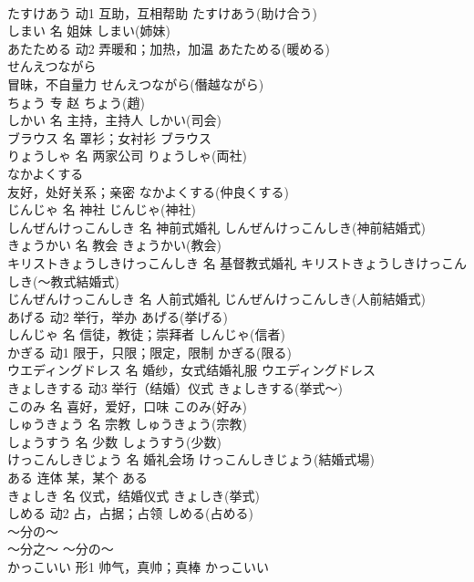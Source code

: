 \documentclass[8pt]{extreport}
\begin{document}
\begin{CJK}{UTF8}{min}
\\	たすけあう	动1	互助，互相帮助	たすけあう(助け合う)	
\\	しまい	名	姐妹	しまい(姉妹)	
\\	あたためる	动2	弄暖和；加热，加温	あたためる(暖める)	
\\	せんえつながら	
\\	冒昧，不自量力	せんえつながら(僭越ながら)	
\\	ちょう	专	赵	ちょう(趙)	
\\	しかい	名	主持，主持人	しかい(司会)	
\\	ブラウス	名	罩衫；女衬衫	ブラウス	
\\	りょうしゃ	名	两家公司	りょうしゃ(両社)	
\\	なかよくする	
\\	友好，处好关系；亲密	なかよくする(仲良くする)	
\\	じんじゃ	名	神社	じんじゃ(神社)	
\\	しんぜんけっこんしき	名	神前式婚礼	しんぜんけっこんしき(神前結婚式)	
\\	きょうかい	名	教会	きょうかい(教会)	
\\	キリストきょうしきけっこんしき	名	基督教式婚礼	キリストきょうしきけっこんしき(～教式結婚式)	
\\	じんぜんけっこんしき	名	人前式婚礼	じんぜんけっこんしき(人前結婚式)	
\\	あげる	动2	举行，举办	あげる(挙げる)	
\\	しんじゃ	名	信徒，教徒；崇拜者	しんじゃ(信者)	
\\	かぎる	动1	限于，只限；限定，限制	かぎる(限る)	
\\	ウエディングドレス	名	婚纱，女式结婚礼服	ウエディングドレス	
\\	きょしきする	动3	举行（结婚）仪式	きょしきする(挙式～)	
\\	このみ	名	喜好，爱好，口味	このみ(好み)	
\\	しゅうきょう	名	宗教	しゅうきょう(宗教)	
\\	しょうすう	名	少数	しょうすう(少数)	
\\	けっこんしきじょう	名	婚礼会场	けっこんしきじょう(結婚式場)	
\\	ある	连体	某，某个	ある	
\\	きょしき	名	仪式，结婚仪式	きょしき(挙式)	
\\	しめる	动2	占，占据；占领	しめる(占める)	
\\	～分の～	
\\	～分之～	～分の～	
\\	かっこいい	形1	帅气，真帅；真棒	かっこいい	

\end{CJK}
\end{document}
